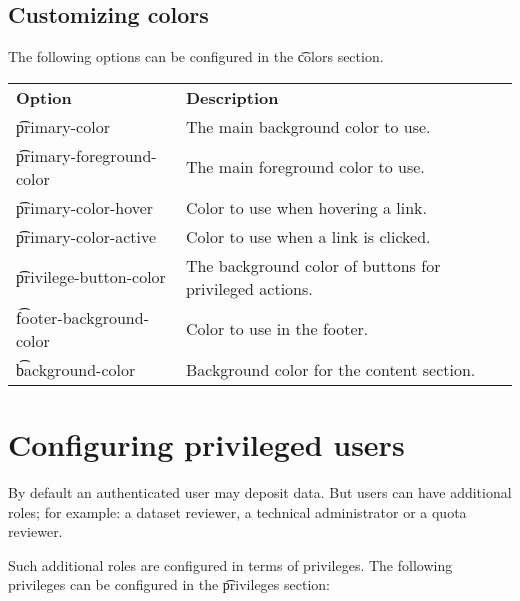 \subsection{Customizing colors}
\label{sec:customize-colors}

  The following options can be configured in the \t{colors} section.

\begin{tabularx}{\textwidth}{*{1}{!{\VRule[-1pt]}l}!{\VRule[-1pt]}X}
  \headrow
  \textbf{Option}              & \textbf{Description}\\
  \t{primary-color}            & The main background color to use.\\
  \t{primary-foreground-color} & The main foreground color to use.\\
  \t{primary-color-hover}      & Color to use when hovering a link.\\
  \t{primary-color-active}     & Color to use when a link is clicked.\\
  \t{privilege-button-color}   & The background color of buttons for
                                 privileged actions.\\
  \t{footer-background-color}  & Color to use in the footer.\\
  \t{background-color}         & Background color for the content section.
\end{tabularx}

\section{Configuring privileged users}

  By default an authenticated user may deposit data. But users can have
  additional roles; for example: a dataset reviewer, a technical
  administrator or a quota reviewer.

  Such additional roles are configured in terms of privileges.  The
  following privileges can be configured in the \t{privileges} section:

